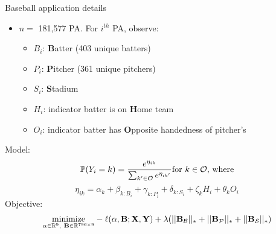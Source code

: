\documentclass[handout]{beamer}
\def\P{\mathcal P}\def\Q{\mathcal Q}\def\R{\mathcal R}\def\S{\mathcal S}
\def\mR{\mathbb R}\def\mS{\mathbb S}
\def\balpha{{\bf \alpha}}\def\bSigma{{\bf \Sigma}}
\begin{document}
\begin{frame}{Baseball application details}
\begin{itemize}
\item $n =$ 181,577 PA. For $i^{th}$ PA, observe:
    \begin{itemize}
    \item $B_i$: {\bf B}atter (403 unique batters)
    \item $P_i$: {\bf P}itcher (361 unique pitchers)
    \item $S_i$: {\bf S}tadium
    \item $H_i$: indicator batter is on {\bf H}ome team
    \item $O_i$: indicator batter has {\bf O}pposite handedness of pitcher's
    \end{itemize}
\end{itemize}
Model:
$$\mathbb P(Y_i = k) = \frac{e^{\eta_{ik}}}{\sum_{k' \in \mathcal O}e^{\eta_{ik'}}}
    \mbox{for $k \in \mathcal O$, where}$$
$$\eta_{ik} = \alpha_k + \beta_{k:B_i} + \gamma_{k:P_i} + \delta_{k:S_i} +
    \zeta_kH_i + \theta_kO_i$$
Objective:
$$\underset{\balpha\in\mR^9,~\bB\in\mR^{796\times 9}}{\mbox{minimize}}
  -\ell(\alpha,\bB;\bX,\bY) + \lambda(||\bB_\B||_*+||\bB_\P||_*+||\bB_\S||_*)$$
\end{frame}
\end{document}

